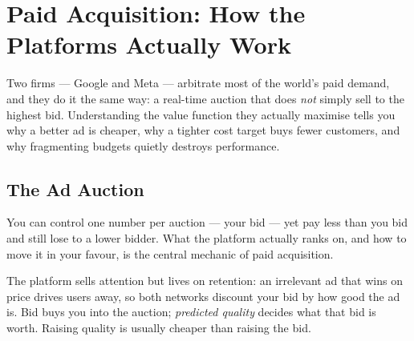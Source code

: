 \chapter{Paid Acquisition: How the Platforms Actually Work}\label{ch:paid-acquisition-platforms}


Two firms --- Google and Meta --- arbitrate most of the world's paid demand, and they do it the same way: a real-time auction that does \emph{not} simply sell to the highest bid. Understanding the value function they actually maximise tells you why a better ad is cheaper, why a tighter cost target buys fewer customers, and why fragmenting budgets quietly destroys performance.

\section{The Ad Auction}\label{sec:ad-auction}

You can control one number per auction --- your bid --- yet pay less than you bid and still lose to a lower bidder. What the platform actually ranks on, and how to move it in your favour, is the central mechanic of paid acquisition.

The platform sells attention but lives on retention: an irrelevant ad that wins on price drives users away, so both networks discount your bid by how good the ad is. Bid buys you into the auction; \emph{predicted quality} decides what that bid is worth. Raising quality is usually cheaper than raising the bid.

